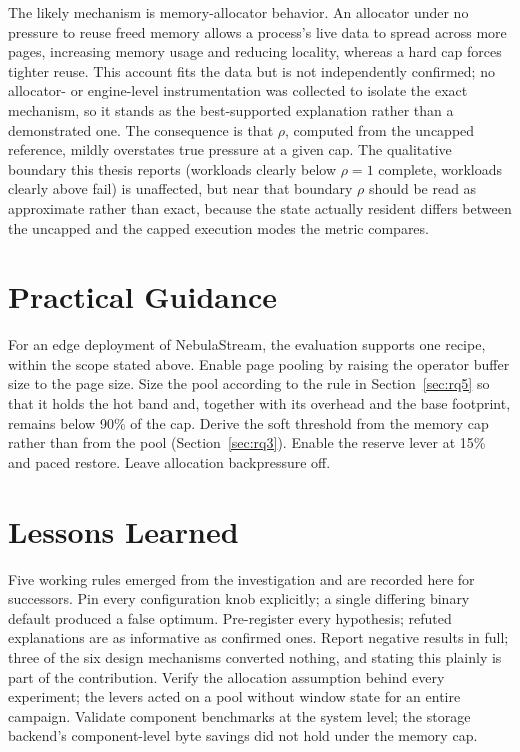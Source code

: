 The likely mechanism is memory-allocator behavior.
An allocator under no pressure to reuse freed memory allows a process's live data to spread across more pages, increasing memory usage and reducing locality, whereas a hard cap forces tighter reuse.
This account fits the data but is not independently confirmed; no allocator- or engine-level instrumentation was collected to isolate the exact mechanism, so it stands as the best-supported explanation rather than a demonstrated one.
The consequence is that $\rho$, computed from the uncapped reference, mildly overstates true pressure at a given cap.
The qualitative boundary this thesis reports (workloads clearly below $\rho = 1$ complete, workloads clearly above fail) is unaffected, but near that boundary $\rho$ should be read as approximate rather than exact, because the state actually resident differs between the uncapped and the capped execution modes the metric compares.

\section{Practical Guidance\label{sec:guidance}}

For an edge deployment of NebulaStream, the evaluation supports one recipe, within the scope stated above.
Enable page pooling by raising the operator buffer size to the page size.
Size the pool according to the rule in Section~\ref{sec:rq5} so that it holds the hot band and, together with its overhead and the base footprint, remains below 90\% of the cap.
Derive the soft threshold from the memory cap rather than from the pool (Section~\ref{sec:rq3}).
Enable the reserve lever at 15\% and paced restore.
Leave allocation backpressure off.

\section{Lessons Learned\label{sec:lessons}}

Five working rules emerged from the investigation and are recorded here for successors.
Pin every configuration knob explicitly; a single differing binary default produced a false optimum.
Pre-register every hypothesis; refuted explanations are as informative as confirmed ones.
Report negative results in full; three of the six design mechanisms converted nothing, and stating this plainly is part of the contribution.
Verify the allocation assumption behind every experiment; the levers acted on a pool without window state for an entire campaign.
Validate component benchmarks at the system level; the storage backend's component-level byte savings did not hold under the memory cap.

